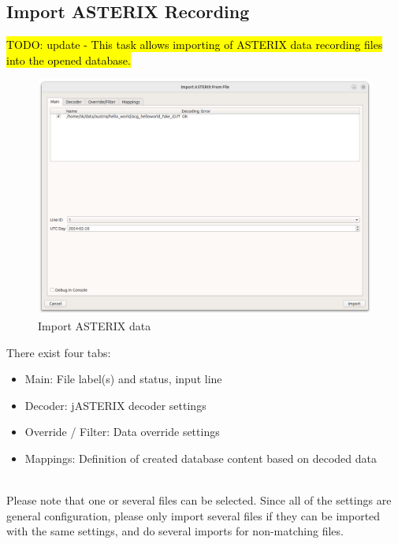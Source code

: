 \subsection{Import ASTERIX Recording}
\label{sec:ui_import_asterix}

\hl{TODO: update - This task allows importing of ASTERIX data recording files into the opened database.} \\

\begin{figure}[H]
  \center
    \hspace*{-0.5cm}
    \includegraphics[width=17cm]{figures/asterix_import_data.png}
  \caption{Import ASTERIX data}
\end{figure}

There exist four tabs:

\begin{itemize}
\item Main: File label(s) and status, input line
\item Decoder: jASTERIX decoder settings
\item Override / Filter: Data override settings
\item Mappings: Definition of created database content based on decoded data
\end{itemize}
\ \\

Please note that one or several files can be selected. Since all of the settings are general configuration, please only import several files if they can be imported with the same settings, and do several imports for non-matching files. \\

